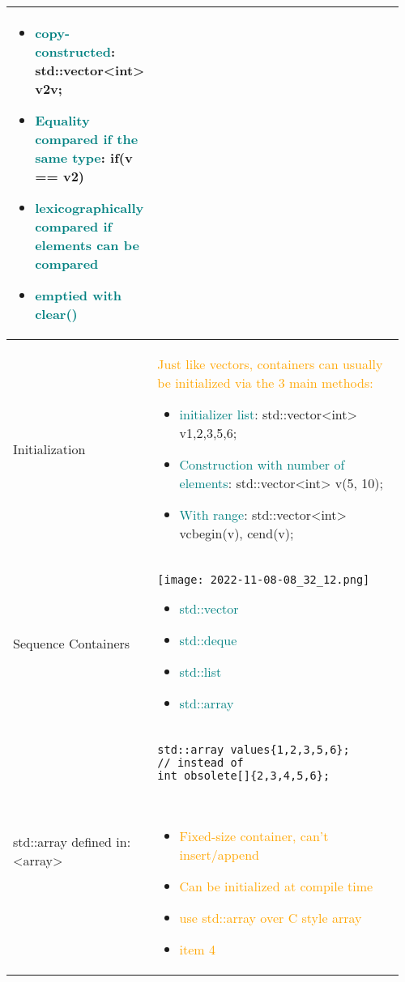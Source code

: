 \documentclass[main.tex,fontsize=8pt,paper=a4,paper=portrait,DIV=calc]{scrartcl}
\begin{document}
\begin{table}[ht!]
\begin{tabular}{|m{0.2\linewidth}|m{0.755\linewidth}|}
\begin{itemize}
  \item \textcolor{teal}{copy-constructed}: std::vector<int> v2{v};
\item \textcolor{teal}{Equality compared if the same type}: if(v == v2)
\item \textcolor{teal}{lexicographically compared if elements can be compared}
\item \textcolor{teal}{emptied with clear()}
\vspace{-2mm}
\end{itemize}\\
\hline
Initialization & 
\textcolor{orange}{Just like vectors, containers can usually be initialized via the 3 main methods: }\newline
\begin{itemize}
  \item \textcolor{teal}{initializer list}: std::vector<int> v{1,2,3,5,6};
  \item \textcolor{teal}{Construction with number of elements}: std::vector<int> v(5, 10);
  \item \textcolor{teal}{With range}: std::vector<int> v{cbegin(v), cend(v)};
\vspace{-2mm}
\end{itemize}\\
\hline
Sequence Containers & 
\vspace{2mm}
\texttt{[image: 2022-11-08-08\_32\_12.png]}\newline
\begin{itemize}
\item \textcolor{teal}{std::vector}
\item \textcolor{teal}{std::deque}
\item \textcolor{teal}{std::list}
\item \textcolor{teal}{std::array}
\vspace{-2mm}
\end{itemize}\\
\hline
std::array \newline
defined in: <array> &
\vspace{2mm}
\begin{lstlisting}
std::array values{1,2,3,5,6};
// instead of
int obsolete[]{2,3,4,5,6};
\end{lstlisting}
\, \newline
\begin{itemize}
\item \textcolor{orange}{Fixed-size container, can't insert/append}
\item \textcolor{orange}{Can be initialized at compile time}
\item \textcolor{orange}{use std::array over C style array}
\item \textcolor{orange}{item 4}
\vspace{-2mm}
\end{itemize}\\ 
\hline
\end{tabular}
\end{table}
\end{document}

